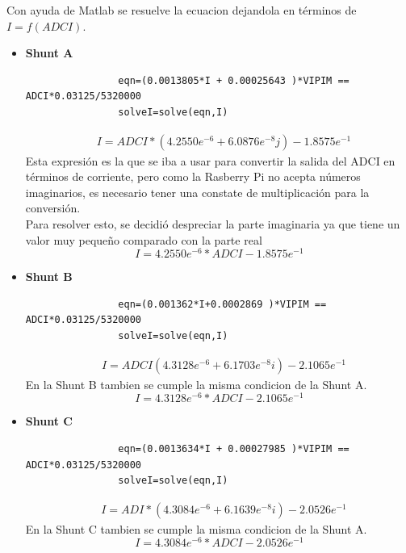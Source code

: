         Con ayuda de Matlab se resuelve la ecuacion dejandola en términos de $I = f(ADCI) $.
        \begin{itemize}
            \item \textbf{Shunt A} 
                \begin{lstlisting}
                eqn=(0.0013805*I + 0.00025643 )*VIPIM == ADCI*0.03125/5320000
                solveI=solve(eqn,I)
                \end{lstlisting}
                \begin{align*}
                    &I = ADCI*( 4.2550e^{ -6}  + 6.0876e^{ -8 }j ) - 1.8575e^{ -1 }
                \end{align*}
                Esta expresión es la que se iba a usar para convertir la salida del ADCI en términos de corriente, pero como la Rasberry Pi no acepta números imaginarios, es necesario tener una constate de multiplicación para la conversión.
                \\
                Para resolver esto, se decidió despreciar la parte imaginaria ya que tiene un valor muy pequeño comparado con la parte real
                \begin{equation}\label{Cnt conversion ShuntA}
                    I = 4.2550e^{ -6 }*ADCI - 1.8575e^{ -1 }
                \end{equation}
            \item \textbf{Shunt B} 
                \begin{lstlisting}
                eqn=(0.001362*I+0.0002869 )*VIPIM == ADCI*0.03125/5320000
                solveI=solve(eqn,I)
                \end{lstlisting}
                \begin{align*}
                    &I = ADCI( 4.3128e^{ -6 } + 6.1703e^{ -8 }i ) - 2.1065e^{ -1 }
                \end{align*}
                En la Shunt B tambien se cumple la misma condicion de la Shunt A. 
                \begin{equation}\label{Cnt conversion ShuntB}
                    I = 4.3128e^{ -6 }*ADCI - 2.1065e^{ -1 }
                \end{equation}
            \item \textbf{Shunt C} 
                \begin{lstlisting}
                eqn=(0.0013634*I + 0.00027985 )*VIPIM == ADCI*0.03125/5320000
                solveI=solve(eqn,I)
                \end{lstlisting}
                \begin{align*}
                    &I = ADI*( 4.3084e^{ -6 } + 6.1639e^{ -8} i ) - 2.0526e^{ -1 }
                \end{align*}
                En la Shunt C tambien se cumple la misma condicion de la Shunt A. 
                \begin{equation}\label{Cnt conversion ShuntC}
                    I = 4.3084e^{ -6 }*ADCI - 2.0526e^{ -1 }
                \end{equation}
        \end{itemize}
    
